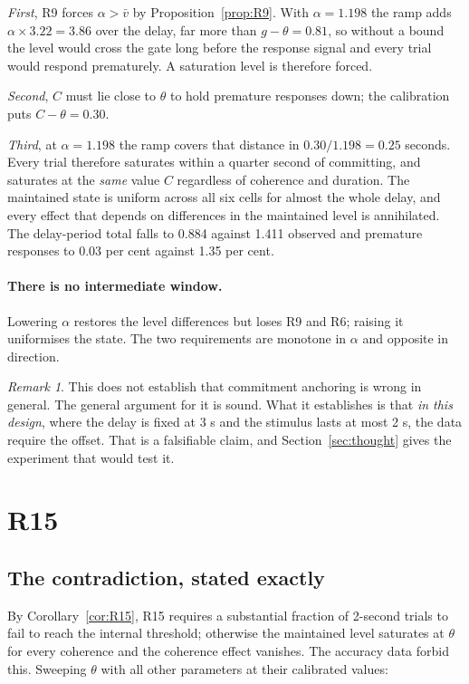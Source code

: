 \documentclass[11pt,a4paper]{article}
\theoremstyle{plain}
\theoremstyle{remark}
\newtheorem{remark}{Remark}
\begin{document}
\emph{First}, R9 forces $\alpha>\bar v$ by Proposition~\ref{prop:R9}. With $\alpha=1.198$
the ramp adds $\alpha\times3.22=3.86$ over the delay, far more than $g-\theta=0.81$, so
without a bound the level would cross the gate long before the response signal and every
trial would respond prematurely. A saturation level is therefore forced.

\emph{Second}, $C$ must lie close to $\theta$ to hold premature responses down; the
calibration puts $C-\theta=0.30$.

\emph{Third}, at $\alpha=1.198$ the ramp covers that distance in $0.30/1.198=0.25$ seconds.
Every trial therefore saturates within a quarter second of committing, and saturates at the
\emph{same} value $C$ regardless of coherence and duration. The maintained state is uniform
across all six cells for almost the whole delay, and every effect that depends on
differences in the maintained level is annihilated. The delay-period total falls to 0.884
against 1.411 observed and premature responses to 0.03 per cent against 1.35 per cent.

\paragraph{There is no intermediate window.} Lowering $\alpha$ restores the level differences
but loses R9 and R6; raising it uniformises the state. The two requirements are monotone in
$\alpha$ and opposite in direction.

\begin{remark}
This does not establish that commitment anchoring is wrong in general. The general argument
for it is sound. What it establishes is that \emph{in this design}, where the delay is fixed
at 3 s and the stimulus lasts at most 2 s, the data require the offset. That is a falsifiable
claim, and Section~\ref{sec:thought} gives the experiment that would test it.
\end{remark}

\section{R15}
\label{sec:R15}

\subsection{The contradiction, stated exactly}

By Corollary~\ref{cor:R15}, R15 requires a substantial fraction of 2-second trials to fail
to reach the internal threshold; otherwise the maintained level saturates at $\theta$ for
every coherence and the coherence effect vanishes. The accuracy data forbid this. Sweeping
$\theta$ with all other parameters at their calibrated values:
\end{document}
